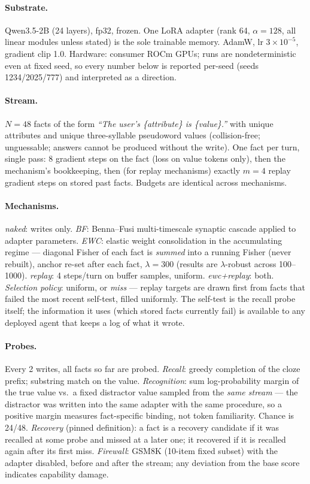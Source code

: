 \documentclass[11pt]{article}
\newcommand{\qwen}{Qwen3.5-2B}
\begin{document}
\paragraph{Substrate.} \qwen{} (24 layers), fp32, frozen. One LoRA adapter (rank 64,
$\alpha{=}128$, all linear modules unless stated) is the sole trainable memory. AdamW, lr $3\times
10^{-5}$, gradient clip 1.0. Hardware: consumer ROCm GPUs; runs are nondeterministic even at fixed
seed, so every number below is reported per-seed (seeds 1234/2025/777) and interpreted as a direction.

\paragraph{Stream.} $N{=}48$ facts of the form \emph{``The user's \{attribute\} is \{value\}.''} with
unique attributes and unique three-syllable pseudoword values (collision-free; unguessable; answers
cannot be produced without the write). One fact per turn, single pass: 8 gradient steps on the fact
(loss on value tokens only), then the mechanism's bookkeeping, then (for replay mechanisms) exactly
$m{=}4$ replay gradient steps on stored past facts. Budgets are identical across mechanisms.

\paragraph{Mechanisms.} \emph{naked}: writes only. \emph{BF}: Benna--Fusi multi-timescale synaptic
cascade \citep{benna2016} applied to adapter parameters. \emph{EWC}: elastic weight consolidation
\citep{kirkpatrick2017} in the accumulating regime --- diagonal Fisher of each fact is \emph{summed}
into a running Fisher (never rebuilt), anchor re-set after each fact, $\lambda{=}300$ (results are
$\lambda$-robust across 100--1000). \emph{replay}: 4 steps/turn on buffer samples, uniform.
\emph{ewc+replay}: both. \emph{Selection policy}: uniform, or \emph{miss} --- replay targets are drawn
first from facts that failed the most recent self-test, filled uniformly. The self-test is the recall
probe itself; the information it uses (which stored facts currently fail) is available to any deployed
agent that keeps a log of what it wrote.

\paragraph{Probes.} Every 2 writes, all facts so far are probed. \emph{Recall}: greedy completion of
the cloze prefix; substring match on the value. \emph{Recognition}: sum log-probability margin of the
true value vs.\ a fixed distractor value sampled from the \emph{same stream} --- the distractor was
written into the same adapter with the same procedure, so a positive margin measures fact-specific
binding, not token familiarity. Chance is 24/48. \emph{Recovery} (pinned definition): a fact is a
recovery candidate if it was recalled at some probe and missed at a later one; it recovered if it is
recalled again after its first miss. \emph{Firewall}: GSM8K (10-item fixed subset) with the adapter
disabled, before and after the stream; any deviation from the base score indicates capability damage.
\end{document}
